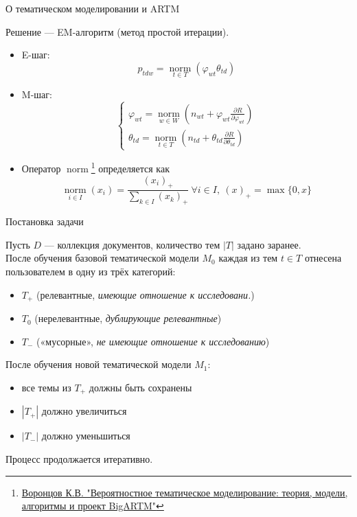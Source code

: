 \documentclass{beamer}
\DeclareMathOperator*{\norm}{\text{norm}}
\begin{document}
\begin{frame}{О тематическом моделировании и ARTM}

Решение — EM-алгоритм (метод простой итерации).

\begin{itemize}
    \item E-шаг:
    $$p_{tdw} = \norm \limits_{t \in T} (\varphi_{wt} \theta_{td})$$
    \item M-шаг:
    $$
    \begin{cases}
    \varphi_{wt} = \norm \limits_{w \in W} (n_{wt} + \varphi_{wt} \frac{\partial R}{\partial \varphi_{wt}}) \\
    \theta_{td} = \norm \limits_{t \in T} (n_{td} + \theta_{td} \frac{\partial R}{\partial \theta_{td}})
    \end{cases}
    $$
    \item Оператор $\norm$\footnote{\href{http://www.machinelearning.ru/wiki/images/d/d5/Voron17survey-artm.pdf}{Воронцов К.В. "Вероятностное тематическое моделирование: теория, модели, алгоритмы и проект BigARTM"}} определяется как
    $$
    \norm \limits_{i \in I} (x_i) = \frac{{(x_i)}_+}{\sum \limits_{k \in I} {(x_k)}_+} \ \forall i \in I,\ {(x)}_+ = \max \{ 0, x \}
    $$
\end{itemize}

\end{frame}
\begin{frame}{Постановка задачи}

Пусть $D$ — коллекция документов, количество тем $|T|$ задано заранее. \\
После обучения базовой тематической модели $M_0$ каждая из тем $t \in T$ отнесена пользователем в одну из трёх категорий:
\begin{itemize}
    \item $T_+$ (релевантные, \textit{имеющие отношение к исследовани.})
    \item $T_0$ (нерелевантные, \textit{дублирующие релевантные})
    \item $T_-$ («мусорные», \textit{не имеющие отношение к исследованию})
\end{itemize}
После обучения новой тематической модели $M_1$:

\begin{itemize}
    \item все темы из $T_+$ должны быть сохранены
    \item $|T_+|$ должно увеличиться
    \item $|T_-|$ должно уменьшиться
\end{itemize}

Процесс продолжается итеративно.

\end{frame}
\end{document}
